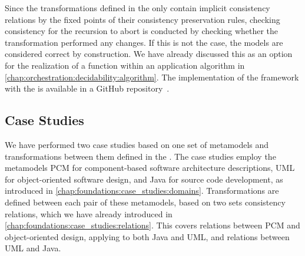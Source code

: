Since the transformations defined in the \reactionslanguage only contain implicit consistency relations by the fixed points of their consistency preservation rules, checking consistency for the recursion to abort is conducted by checking whether the transformation performed any changes.
If this is not the case, the models are considered correct by construction.
We have already discussed this as an option for the realization of a  function within an application algorithm in \autoref{chap:orchestration:decidability:algorithm}.
The implementation of the framework with the \reactionslanguage is available in a GitHub repository~\cite{vitruvFrameworkGithub}.






\subsection{Case Studies}
\label{chap:correctness_evaluation:categorization:case_studies}

We have performed two case studies based on one set of metamodels and transformations between them defined in the \reactionslanguage.
The case studies employ the metamodels \gls{PCM} for component-based software architecture descriptions, \gls{UML} for object-oriented software design, and Java for source code development, as introduced in \autoref{chap:foundations:case_studies:domains}.
Transformations are defined between each pair of these metamodels, based on two sets consistency relations, which we have already introduced in \autoref{chap:foundations:case_studies:relations}.
This covers relations between \gls{PCM} and object-oriented design, applying to both Java and \gls{UML}, and relations between \gls{UML} and Java.

